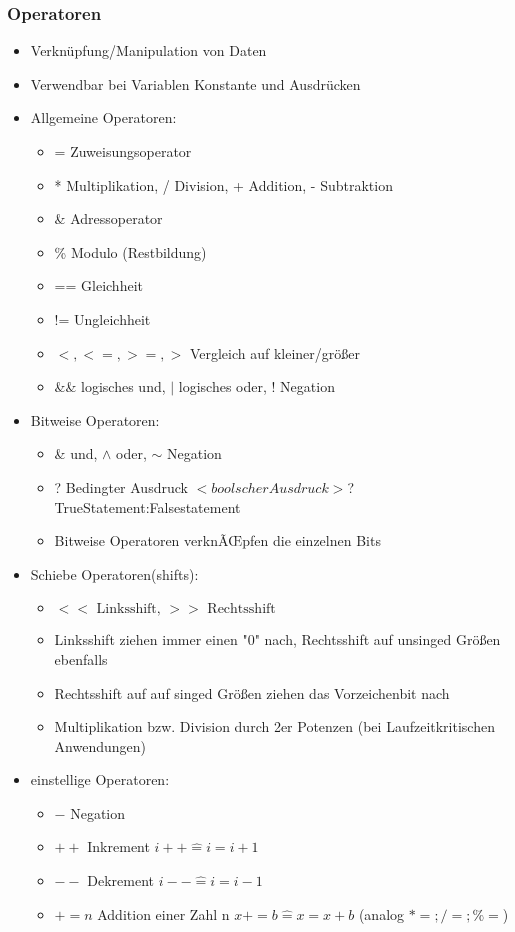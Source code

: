 \documentclass[10pt,a5paper]{article}
\begin{document}
\subsubsection{Operatoren}
\begin{itemize}
\item Verknüpfung/Manipulation von Daten
\item Verwendbar bei Variablen Konstante und Ausdrücken
\item Allgemeine Operatoren:\begin{itemize}
\item = Zuweisungsoperator
\item * Multiplikation, / Division, + Addition, - Subtraktion
\item \& Adressoperator
\item \% Modulo (Restbildung)
\item == Gleichheit 
\item != Ungleichheit
\item   \ensuremath{<,<=,>=,>} Vergleich auf kleiner/größer
\item  \&\& logisches und, \ensuremath{\vert} logisches oder, ! Negation 
\end{itemize}
\item Bitweise Operatoren: \begin{itemize}
\item \& und, \ensuremath{\land}  oder,  \ensuremath{\sim}  Negation
\item ? Bedingter Ausdruck \subitem \ensuremath{<boolscher Ausdruck>}?TrueStatement:Falsestatement\item Bitweise Operatoren verknÃŒpfen die einzelnen Bits 

\end{itemize}
\item Schiebe Operatoren(shifts): \begin{itemize}
\item \ensuremath{<< \text{ Linksshift, } >> \text{ Rechtsshift}}
\item Linksshift ziehen immer einen "0" nach, Rechtsshift auf unsinged Größen ebenfalls
\item Rechtsshift auf auf singed Größen ziehen das Vorzeichenbit nach
\item Multiplikation bzw. Division durch 2er Potenzen (bei Laufzeitkritischen Anwendungen)
\end{itemize}
\item einstellige Operatoren:\begin{itemize}
\item \ensuremath{-} Negation
\item \ensuremath{++} Inkrement \ensuremath{i++\widehat{=} i=i+1}
\item \ensuremath{--} Dekrement \ensuremath{i--\widehat{=} i=i-1}
\item \ensuremath{+=n} Addition einer Zahl n \ensuremath{x+=b\widehat{=} x=x+b} (analog \ensuremath{*=;/=;\% =})
\end{itemize}
\end{itemize}
\end{document}
